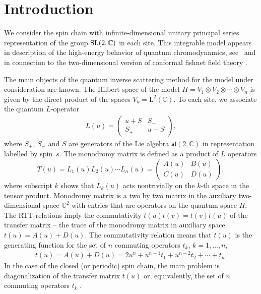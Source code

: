 \documentclass[pdftex]{sigma}
\numberwithin{equation}{section}
\begin{document}
\section{Introduction}

We consider the spin chain with infinite-dimensional unitary principal series representation of the group ${\rm SL}(2,\mathbb{C})$ in each site.
This integrable model appears in description of the high-energy behavior of
quantum chromodynamics, see~\cite{FK, L0,L1,L2} and
in connection to the two-dimensional version \cite{DKO, KO} of conformal
fishnet field theory \cite{BCF,BD,BD1,CK,GGKK,GKK,GKKNS,KG}.

The main objects of the quantum inverse scattering method \cite{F,KSk,Skl91,FST,FaTa} for the model under consideration are known.
The Hilbert space of the model $H = V_1\otimes V_2\otimes\cdots\otimes V_n$ is given by the direct product of the spaces $V_k=\mathrm{L}^2(\mathbb{C})$.
To each site, we associate the quantum $L$-operator
\begin{align*}
L(u) =
\begin{pmatrix}
u + S & S_{-} \\
S_{+} & u - S \end{pmatrix} ,
\end{align*}
where $S_{+}$, $S_{-}$ and $S$ are generators of the Lie algebra $\mathfrak{sl}(2,\mathbb{C})$ in representation labelled by spin~$s$.
The monodromy matrix is defined as a product of $L$ operators
\begin{equation} \label{monodromy}
T(u)=L_1(u)L_2(u)\cdots L_n(u) = \begin{pmatrix}
A(u)& B(u)\\
C(u)& D(u)
\end{pmatrix},
\end{equation}
where subscript $k$ shows that $L_k(u)$ acts nontrivially on the $k$-th space in the tensor product.
Monodromy matrix is a two by two matrix in the auxiliary two-dimensional space
$\mathbb{C}^2$ with entries that are operators on the quantum space $H$.
 The RTT-relations \cite{F,KSk,Skl91,FST,FaTa} imply the commutativity
$t(u) t(v) = t(v) t(u)$ of the transfer matrix -- the trace of the
monodromy matrix in auxiliary space
$t(u) = A(u)+D(u)$.
The commutativity relation means that $t(u)$ is the generating function for the set of $n$ commuting operators $t_k$, $k=1,\dots,n$,
\begin{align*}
t(u) = A(u)+D(u) = 2u^n + u^{n-1} t_1 + u^{n-2} t_2
+ \cdots + t_n.
\end{align*}
In the case of the closed (or periodic) spin chain, the main problem is
diagonalization of the transfer matrix $t(u)$ or, equivalently, the set
of $n$ commuting operators $t_k$ \cite{F,KSk,Skl91,FST,FaTa}.
\end{document}
